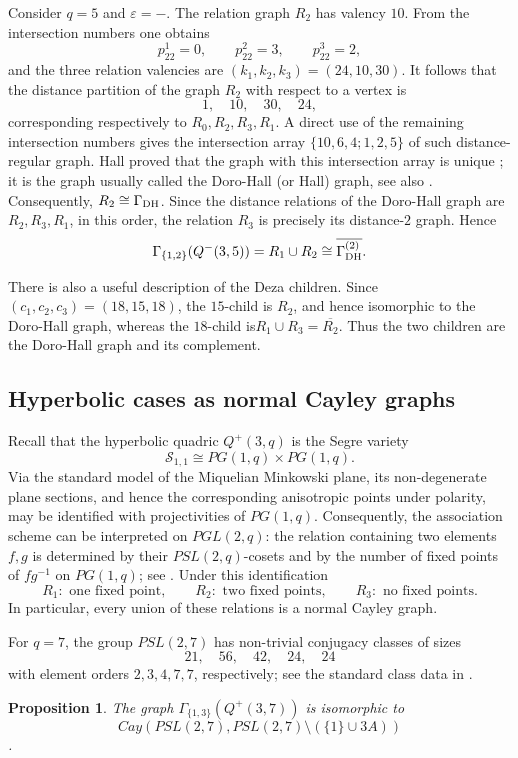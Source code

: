 \documentclass{article}
\theoremstyle{plain}
\newtheorem{prop}[thm]{Proposition}
\begin{document}
Consider $q=5$ and $\varepsilon=-$. The relation graph $R_2$ has valency $10$. From the intersection numbers one obtains
\[
 p_{22}^1=0,\qquad p_{22}^2=3,\qquad p_{22}^3=2,
\]
and the three relation valencies are $(k_1,k_2,k_3)=(24,10,30)$. It follows that the distance partition of the graph $R_2$ with respect to a vertex is
\[
 1,\quad 10,\quad 30,\quad 24,
\]
corresponding respectively to $R_0,R_2,R_3,R_1$.  A direct use of the remaining intersection numbers gives the intersection array $\{10,6,4;1,2,5\}$ of such distance-regular graph. Hall proved that the graph with this intersection array is unique \cite{Hall1980}; it is the graph usually called the Doro-Hall (or Hall) graph, see also \cite[Section~12.2]{BrouwerCohenNeumaier1989}.
Consequently, $R_2\cong \Gamma_{\rm DH}$. Since the distance relations of the Doro-Hall graph are $R_2,R_3,R_1$, in this order, the relation $R_3$ is precisely its distance-$2$ graph. Hence
\[
\Gamma_{\{1,2\}}(Q^-(3,5))
=R_1\cup R_2
\cong \overline{\Gamma_{\rm DH}^{(2)}}.
\]

There is also a useful description of the Deza children. Since $(c_1,c_2,c_3)=(18,15,18)$, the $15$-child is $R_2$, and hence isomorphic to the Doro-Hall graph, whereas the $18$-child is$R_1\cup R_3=\overline{R_2}$. Thus the two children are the Doro-Hall graph and its complement.

\subsection{Hyperbolic cases as normal Cayley graphs}
Recall that the hyperbolic quadric $Q^+(3,q)$ is the Segre variety
\[
\mathcal S_{1,1}\cong PG(1,q)\times PG(1,q).
\]
Via the standard model of the Miquelian Minkowski plane, its non-degenerate plane sections, and hence the corresponding anisotropic points under polarity, may be identified with projectivities of
$PG(1,q)$. Consequently, the association scheme can be interpreted on $PGL(2,q)$: the relation containing two elements $f,g$ is determined
by their $PSL(2,q)$-cosets and by the number of fixed points of $fg^{-1}$ on $PG(1,q)$; see \cite[Remark~4.20]{AdriaensenDeBoeck2025}.  
Under this identification
\[
 R_1:\text{ one fixed point},\qquad
 R_2:\text{ two fixed points},\qquad
 R_3:\text{ no fixed points}.
\]
In particular, every union of these relations is a normal Cayley graph.

For $q=7$, the group $PSL(2,7)$ has non-trivial conjugacy classes of sizes
\[
 21,\quad 56,\quad 42,\quad 24,\quad24
\]
with element orders $2,3,4,7,7$, respectively; see the standard class
data in \cite{Atlas1985}. 
\begin{prop}
The graph $\Gamma_{\{1,3\}}(Q^+(3,7))$ is isomorphic to $$Cay(PSL(2,7),PSL(2,7)\setminus(\{1\}\cup3A))$$.
\end{prop}
\end{document}
